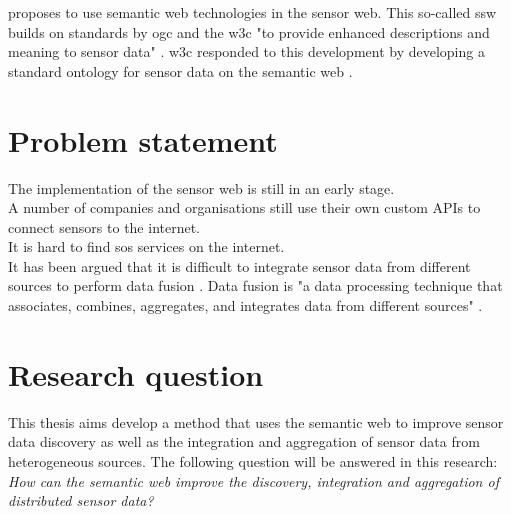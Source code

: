 \cite{SSW:Sheth} proposes to use semantic web technologies in the sensor web. This so-called \ac{ssw} builds on standards by \ac{ogc} and the \ac{w3c} "to provide enhanced descriptions and meaning to sensor data" \cite[p.78]{SSW:Sheth}. \ac{w3c} responded to this development by developing a standard ontology for sensor data on the semantic web \citep{SSW:SSN_incubatorGroup}. 
 
\section{Problem statement}
The implementation of the sensor web is still in an early stage. \\

A number of companies and organisations still use their own custom APIs to connect sensors to the internet. \\

It is hard to find \ac{sos} services on the internet. \\

It has been argued that it is difficult to integrate sensor data from different sources to perform data fusion \citep{SSW:Corcho, SSW:Ji, SSW:Wang}. Data fusion is "a data processing technique that associates, combines, aggregates, and integrates data from different sources" \cite[p. 2]{SSW:Wang2}. \\

\section{Research question}

This thesis aims develop a method that uses the semantic web to improve sensor data discovery as well as the integration and aggregation of sensor data from heterogeneous sources. The following question will be answered in this research:   
\textit{How can the semantic web improve the discovery, integration and aggregation of distributed sensor data?} 












































